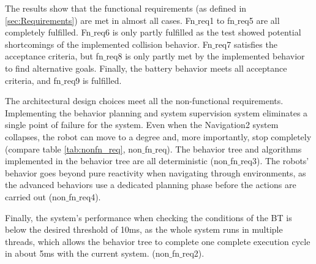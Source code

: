 \begin{table}[ht]
	\centering
	\caption{Results}
	\label{tab:results}
	\renewcommand{\arraystretch}{1.5}
\end{table} 

The results show that the functional requirements (as defined in \ref{sec:Requirements}) are met in almost all cases. Fn$\_$req1 to fn$\_$req5 are all completely fulfilled. Fn$\_$req6 is only partly fulfilled as the test showed potential shortcomings of the implemented collision behavior. Fn$\_$req7 satisfies the acceptance criteria, but fn$\_$req8 is only partly met by the implemented behavior to find alternative goals. Finally, the battery behavior meets all acceptance criteria, and fn$\_$req9 is fulfilled.

The architectural design choices meet all the non-functional requirements. Implementing the behavior planning and system supervision system eliminates a single point of failure for the system. Even when the Navigation2 system collapses, the robot can move to a degree and, more importantly, stop completely (compare table \ref{tab:nonfn_req}, non$\_$fn$\_$req). The behavior tree and algorithms implemented in the behavior tree are all deterministic (non$\_$fn$\_$req3). The robots' behavior goes beyond pure reactivity when navigating through environments, as the advanced behaviors use a dedicated planning phase before the actions are carried out (non$\_$fn$\_$req4). 

Finally, the system's performance when checking the conditions of the BT is below the desired threshold of 10ms, as the whole system runs in multiple threads, which allows the behavior tree to complete one complete execution cycle in about 5ms with the current system. (non$\_$fn$\_$req2). 